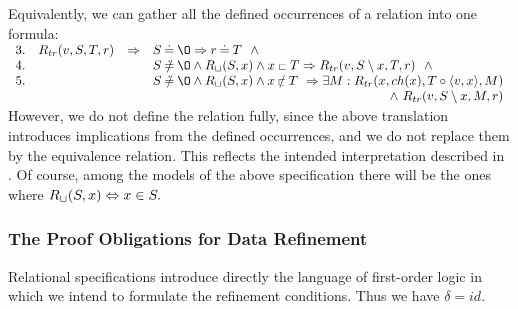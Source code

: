 \noindent
Equivalently, we can gather all the defined occurrences of a relation into one
formula:\\[1ex]
\(\begin{array}{rrcl}
3. & \Pre R{tr}(v,S,T,r) & \impl & S\Eq \es \impl r\Eq T\ \ \land \\ 4. & & & S\Not\Eq\es\land\Pre R\ch(S,x)\land x\lin T \impl 
\Pre R{tr}(v,S\setminus x,T,r)\ \ \land \\ 5. & & & S\Not\Eq\es\land\Pre R\ch(S,x)\land x\Not\lin T\ \impl 
\exists M: \Pre R{tr}(x,ch(x),T\ap\<v,x\>,M) \\ & \multicolumn{3}{r}{\land\ \Pre R{tr}(v,S\setminus x,M,r)} \end{array} \)\\[1ex]
\noindent However, we do not define the relation fully, since the above translation introduces implications from the defined occurrences, and we do not replace them by the equivalence relation. This reflects the intended
interpretation described in . Of course, among the models of the above specification there will be the ones where $R_{\sqcup}(S,x)\mathrel{\Leftrightarrow} x\in S.$

\subsubsection{The Proof Obligations for Data Refinement} Relational specifications introduce directly the language of first-order logic in which we intend to formulate the refinement conditions. Thus we have $\delta = id$. 

